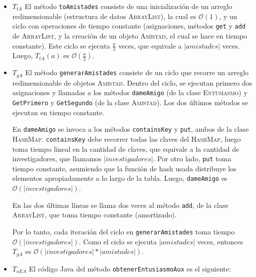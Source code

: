 \documentclass[12pt, a4paper,english,spanish]{article}
\begin{document}
\begin{itemize}
\item $T_{tA}$
El m\'etodo \texttt{toAmistades} consiste de una inicializaci\'on de un arreglo redimensionable (estructura de datos \textsc{ArrayList}), la cual es $\mathcal{O}(1)$, y un ciclo con operaciones de tiempo constante (asignaciones, m\'etodos \texttt{get} y \texttt{add} de \textsc{ArrayList}\cite{java}, y la creaci\'on de un objeto \textsc{Amistad}, el cual se hace en tiempo constante). Este ciclo se ejecuta $\frac{a}{2}$ veces, que equivale a $|amistades|$ veces. Luego, $T_{tA}(a)$ es $\mathcal{O}(\frac{a}{2})$.

\item $T_{gA}$
El m\'etodo \texttt{generarAmistades} consiste de un ciclo que recorre un arreglo redimensionable de objetos \textsc{Amistad}. Dentro del ciclo, se ejecutan primero dos asignaciones y llamadas a los m\'etodos \texttt{dameAmigo} (de la clase \textsc{Entusiasmo}) y \texttt{GetPrimero} y \texttt{GetSegundo} (de la clase \textsc{Amistad}). Los dos \'ultimos m\'etodos se ejecutan en tiempo constante. 

En \texttt{dameAmigo} se invoca a los m\'etodos \texttt{containsKey} y \texttt{put}, ambos de la clase \textsc{HashMap}. \texttt{containsKey} debe recorrer todas las claves del \textsc{HashMap}, luego toma tiempo lineal en la cantidad de claves\cite{java}, que equivale a la cantidad de investigadores, que llamamos $|investigadores|$. Por otro lado, \texttt{put} toma tiempo constante, asumiendo que la funci\'on de hash usada distribuye los elementos apropiadamente a lo largo de la tabla\cite{java}. Luego, \texttt{dameAmigo} es $\mathcal{O}(|investigadores|)$.

En las dos \'ultimas l\'ineas se llama dos veces al m\'etodo \texttt{add}, de la clase \textsc{ArrayList}, que toma tiempo constante (amortizado)\cite{java}. 

Por lo tanto, cada iteraci\'on del ciclo en \texttt{generarAmistades} toma tiempo \\ $\mathcal{O}(|investigadores|)$. Como el ciclo se ejecuta $|amistades|$ veces, entonces $T_{gA}$ es $\mathcal{O}(|investigadores| * |amistades|)$.

\item $T_{oEA}$
El c\'odigo Java del m\'etodo \texttt{obtenerEntusiasmoAux} es el siguiente:


\end{itemize}
\end{document}
